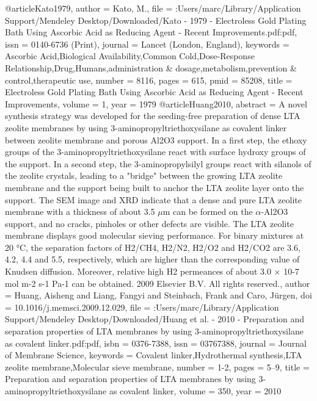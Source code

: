 @article{Kato1979,
author = {Kato, M.},
file = {:Users/marc/Library/Application Support/Mendeley Desktop/Downloaded/Kato - 1979 - Electroless Gold Plating Bath Using Ascorbic Acid as Reducing Agent - Recent Improvements.pdf:pdf},
issn = {0140-6736 (Print)},
journal = {Lancet (London, England)},
keywords = {Ascorbic Acid,Biological Availability,Common Cold,Dose-Response Relationship,Drug,Humans,administration {\&} dosage,metabolism,prevention {\&} control,therapeutic use},
number = {8116},
pages = {615},
pmid = {85208},
title = {{Electroless Gold Plating Bath Using Ascorbic Acid as Reducing Agent - Recent Improvements}},
volume = {1},
year = {1979}
}
@article{Huang2010,
abstract = {A novel synthesis strategy was developed for the seeding-free preparation of dense LTA zeolite membranes by using 3-aminopropyltriethoxysilane as covalent linker between zeolite membrane and porous Al2O3 support. In a first step, the ethoxy groups of the 3-aminopropyltriethoxysilane react with surface hydroxy groups of the support. In a second step, the 3-aminopropylsilyl groups react with silanols of the zeolite crystals, leading to a "bridge" between the growing LTA zeolite membrane and the support being built to anchor the LTA zeolite layer onto the support. The SEM image and XRD indicate that a dense and pure LTA zeolite membrane with a thickness of about 3.5 $\mu$m can be formed on the $\alpha$-Al2O3 support, and no cracks, pinholes or other defects are visible. The LTA zeolite membrane displays good molecular sieving performance. For binary mixtures at 20 °C, the separation factors of H2/CH4, H2/N2, H2/O2 and H2/CO2 are 3.6, 4.2, 4.4 and 5.5, respectively, which are higher than the corresponding value of Knudsen diffusion. Moreover, relative high H2 permeances of about 3.0 × 10-7 mol m-2 s-1 Pa-1 can be obtained. {\textcopyright} 2009 Elsevier B.V. All rights reserved.},
author = {Huang, Aisheng and Liang, Fangyi and Steinbach, Frank and Caro, J{\"{u}}rgen},
doi = {10.1016/j.memsci.2009.12.029},
file = {:Users/marc/Library/Application Support/Mendeley Desktop/Downloaded/Huang et al. - 2010 - Preparation and separation properties of LTA membranes by using 3-aminopropyltriethoxysilane as covalent linker.pdf:pdf},
isbn = {0376-7388},
issn = {03767388},
journal = {Journal of Membrane Science},
keywords = {Covalent linker,Hydrothermal synthesis,LTA zeolite membrane,Molecular sieve membrane},
number = {1-2},
pages = {5--9},
title = {{Preparation and separation properties of LTA membranes by using 3-aminopropyltriethoxysilane as covalent linker}},
volume = {350},
year = {2010}
}
